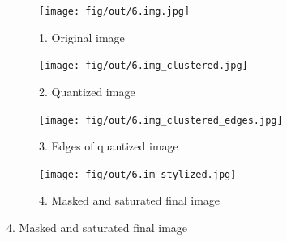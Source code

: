 \documentclass[tikz,14pt,fleqn]{article}
\begin{document}
\begin{figure}[h!]
\end{figure}

\begin{figure}[h!]
    \centering
    \begin{subfigure}[t]{.245\linewidth}
        \texttt{[image: fig/out/6.img.jpg]}
        \caption{1. Original image}
        \label{fig:6.img}
    \end{subfigure}
    \begin{subfigure}[t]{.245\linewidth}
        \texttt{[image: fig/out/6.img\_clustered.jpg]}
        \caption{2. Quantized image}
        \label{fig:6.img_clustered}
    \end{subfigure}
    \begin{subfigure}[t]{.245\linewidth}
        \texttt{[image: fig/out/6.img\_clustered\_edges.jpg]}
        \caption{3. Edges of quantized image}
        \label{fig:6.img_clustered_edges}
    \end{subfigure}
    \begin{subfigure}[t]{.245\linewidth}
        \texttt{[image: fig/out/6.im\_stylized.jpg]}
        \caption{4. Masked and saturated final image}
        \label{fig:6.im_stylized}
    \end{subfigure}
\end{figure}
\end{document}
